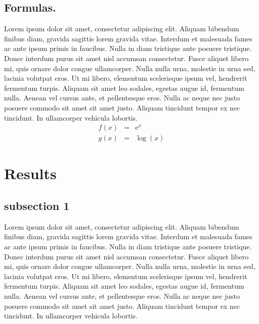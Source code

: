 \documentclass[10pt,letterpaper,twocolumn]{article}
\begin{document}
\subsection*{Formulas.}
Lorem ipsum dolor sit amet, consectetur adipiscing elit. Aliquam bibendum
finibus diam, gravida sagittis lorem gravida vitae. Interdum et malesuada fames
ac ante ipsum primis in faucibus. Nulla in diam tristique ante posuere
tristique. Donec interdum purus sit amet nisl accumsan consectetur. Fusce
aliquet libero mi, quis ornare dolor congue ullamcorper. Nulla nulla urna,
molestie in urna sed, lacinia volutpat eros. Ut mi libero, elementum scelerisque
ipsum vel, hendrerit fermentum turpis. Aliquam sit amet leo sodales, egestas
augue id, fermentum nulla. Aenean vel cursus ante, et pellentesque eros. Nulla
ac neque nec justo posuere commodo sit amet sit amet justo. Aliquam tincidunt
tempor ex nec tincidunt. In ullamcorper vehicula lobortis.
\begin{eqnarray}
    f(x) &=& \mathrm{e}^x \nonumber\\
    g(x) &=& \log(x)      \nonumber
\end{eqnarray}

\section*{Results}
\subsection*{subsection 1}
Lorem ipsum dolor sit amet, consectetur adipiscing elit. Aliquam bibendum
finibus diam, gravida sagittis lorem gravida vitae. Interdum et malesuada fames
ac ante ipsum primis in faucibus. Nulla in diam tristique ante posuere
tristique. Donec interdum purus sit amet nisl accumsan consectetur. Fusce
aliquet libero mi, quis ornare dolor congue ullamcorper. Nulla nulla urna,
molestie in urna sed, lacinia volutpat eros. Ut mi libero, elementum scelerisque
ipsum vel, hendrerit fermentum turpis. Aliquam sit amet leo sodales, egestas
augue id, fermentum nulla. Aenean vel cursus ante, et pellentesque eros. Nulla
ac neque nec justo posuere commodo sit amet sit amet justo. Aliquam tincidunt
tempor ex nec tincidunt. In ullamcorper vehicula lobortis.
\end{document}
